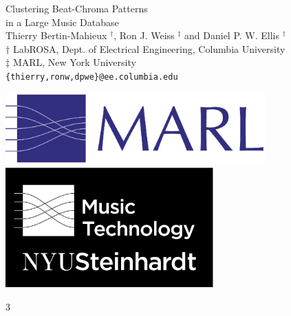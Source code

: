 \documentclass[portrait,a0b,final]{a0poster}
\newenvironment{poster}{
  \begin{center}
  \begin{minipage}[c]{0.98\textwidth}
}{
  \end{minipage} 
  \end{center}
}
\newenvironment{pcolumn}[1]{
  \begin{minipage}{#1\textwidth}
  \begin{center}
}{
  \end{center}
  \end{minipage}
}
\begin{document}
\begin{poster}
\begin{center}
\begin{pcolumn}{0.98}
{%
\begin{minipage}[c][9cm][c]{0.58\textwidth}
  \begin{center}
    {\sc \Huge Clustering Beat-Chroma Patterns}\\[5mm]
  {\sc \Huge in a Large Music Database}\\[10mm]
    {\Large Thierry Bertin-Mahieux $^\dagger$, Ron J. Weiss $^\ddagger$ and Daniel P. W. Ellis $^\dagger$\\[3.5mm]
     \large $\dagger$ LabROSA, Dept. of Electrical Engineering, Columbia University \\
     \large $\ddagger$ MARL, New York University \\
    \tt{\{thierry,ronw,dpwe\}@ee.columbia.edu}}
  \end{center}
\end{minipage}
\begin{minipage}[c][7cm][c]{0.2\textwidth}
  \begin{center}
    \includegraphics[width=10cm,angle=0]{MARL_logo_high_res.eps} \\
    \vspace{1.5cm}
    \includegraphics[width=8cm,angle=0]{nyu_music_tech_logo_2_2_bw.eps}
  \end{center}
\end{minipage}



}
\end{pcolumn}
\end{center}

\vspace*{0.5cm}


\begin{multicols}{3}



\end{multicols}
\end{poster}
\end{document}
